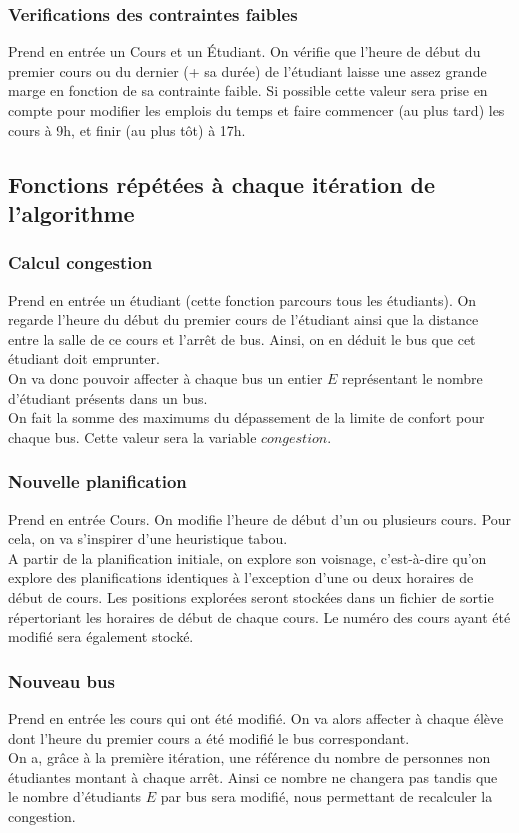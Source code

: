 \documentclass[a4paper,11pt]{article}
\begin{document}
		\subsubsection{Verifications des contraintes faibles}
			Prend en entrée un Cours et un Étudiant.
			On vérifie que l'heure de début du premier cours ou du dernier (+ sa durée) de l'étudiant laisse une assez grande marge en fonction de sa contrainte faible. Si possible cette valeur sera prise en compte pour modifier les emplois du temps et faire commencer (au plus tard) les cours à 9h, et finir (au plus tôt) à 17h.
		\subsection{Fonctions répétées à chaque itération de l'algorithme}
			\subsubsection{Calcul congestion}
				Prend en entrée un étudiant (cette fonction parcours tous les étudiants).
				On regarde l'heure du début du premier cours de l'étudiant ainsi que la distance entre la salle de ce cours et l'arrêt de bus. Ainsi, on en déduit le bus que cet étudiant doit emprunter.\\
				On va donc pouvoir affecter à chaque bus un entier $E$ représentant le nombre d'étudiant présents dans un bus.\\
				On fait la somme des maximums du dépassement de la limite de confort pour chaque bus. Cette valeur sera la variable $congestion$.
			\subsubsection{Nouvelle planification}
				Prend en entrée Cours.
				On modifie l'heure de début d'un ou plusieurs cours. Pour cela, on va s'inspirer d'une heuristique tabou.\\
				A partir de la planification initiale, on explore son voisnage, c'est-à-dire qu'on explore des planifications identiques à l'exception
				d'une ou deux horaires de début de cours. Les positions explorées seront stockées dans un fichier de sortie répertoriant les horaires de début de chaque cours. Le numéro des cours ayant été modifié sera également stocké.
			\subsubsection{Nouveau bus}
				Prend en entrée les cours qui ont été modifié.
				On va alors affecter à chaque élève dont l'heure du premier cours a été modifié le bus correspondant.\\
				On a, grâce à la première itération, une référence du nombre de personnes non étudiantes montant à chaque arrêt. Ainsi ce nombre ne changera pas tandis que le nombre d'étudiants $E$ par bus sera modifié, nous permettant de recalculer la congestion. 
\end{document}
